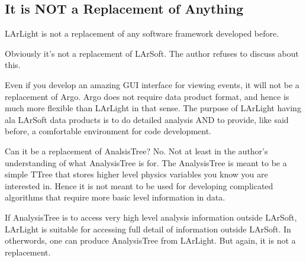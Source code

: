 \subsection{It is NOT a Replacement of Anything}
LArLight is not a replacement of any software framework developed before. 

Obviously it's not a replacement of LArSoft.
The author refuses to discuss about this. 

Even if you develop an amazing GUI interface for viewing events, it will not be a replacement of {\ttfamily Argo}.
{\ttfamily Argo} does not require data product format, and hence is much more flexible than LArLight in that sense.
The purpose of LArLight having ala LArSoft data products is to do detailed analysis AND to provide, like said before,
a comfortable environment for code development.

Can it be a replacement of {\ttfamily AnalsisTree}? 
No. Not at least in the author's understanding of what {\ttfamily AnalysisTree} is for.
The {\ttfamily AnalysisTree} is meant to be a simple {\ttfamily TTree} that stores higher level physics variables you know you are interested in. Hence it is not meant to be used for developing complicated algorithms that require more basic level information in data.

If {\ttfamily AnalysisTree} is to access very high level analysis information outside LArSoft, LArLight is suitable for accessing full detail of information outside LArSoft. In otherwords, one can produce {\ttfamily AnalysisTree} from LArLight. But again, it is not a replacement.







